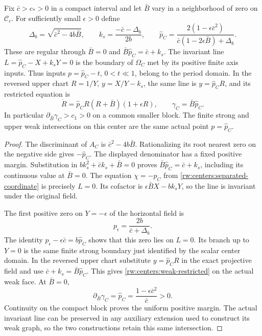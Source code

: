 \begin{lemma}\label{rw:centers:weak-boundary}
Fix $\bar c>c_*>0$ in a compact interval and let $\bar B$ vary
in a neighborhood of zero on $\mathcal C_c$. For sufficiently
small $\epsilon>0$ define
\begin{equation}\label{rw:centers:weak-intersection}
 \Delta_b=\sqrt{\bar c^2-4b\bar B},\qquad
 k_s=\frac{-\bar c-\Delta_b}{2b},\qquad
 \widehat p_C=\frac{2(1-\epsilon\bar c^2)}
                 {\bar c(1-2\epsilon\bar B)+\Delta_b}.
\end{equation}
These are regular through $\bar B=0$ and
$\bar B\widehat p_C=\bar c+k_s$.
The invariant line
$L=\widehat p_C-X+k_sY=0$ is the boundary of $\Omega_C$
met by its positive finite axis inputs. Thus inputs
$p=\widehat p_C-t$, $0<t\ll1$, belong to the period domain.
In the reversed upper chart $R=1/Y$, $y=X/Y-k_s$, the same line
is $y=\widehat p_CR$, and its restricted equation is
\begin{equation}\label{rw:centers:weak-restricted}
 \dot R=\widehat p_CR(R+\bar B)(1+\epsilon R),\qquad
 \gamma_C=\bar B\widehat p_C.
\end{equation}
In particular $\partial_{\bar B}\gamma_C>c_1>0$ on a common
smaller block. The finite strong and upper weak intersections on
this center are the same actual point $p=\widehat p_C$.
\end{lemma}

\begin{proof}
The discriminant of $A_C$ is
$\bar c^2-4b\bar B$. Rationalizing its root nearest zero on the
negative side gives $-\widehat p_C$. The displayed denominator
has a fixed positive margin. Substitution in
$bk_s^2+\bar c k_s+\bar B=0$ proves
$\bar B\widehat p_C=\bar c+k_s$, including its continuous
value at $\bar B=0$. The equation $\chi=-\widehat p_C$
from \eqref{rw:centers:separated-coordinate} is precisely $L=0$.
Its cofactor is $\epsilon\bar BX-bk_sY$, so the line is
invariant under the original field.

The first positive zero on $Y=-\epsilon$ of the horizontal field
is
\[
 p_\epsilon=\frac{2b}{\bar c+\Delta_b}.
\]
The identity $p_\epsilon-\epsilon\bar c=b\widehat p_C$
shows that this zero lies on $L=0$. Its branch up to $Y=0$
is the same finite strong boundary just identified by the scalar
center domain. In the reversed upper chart substitute
$y=\widehat p_CR$ in the exact projective field and use
$\bar c+k_s=\bar B\widehat p_C$. This gives
\eqref{rw:centers:weak-restricted} on the actual weak face. At $\bar B=0$,
\[
 \partial_{\bar B}\gamma_C=\widehat p_C
                =\frac{1-\epsilon\bar c^2}{\bar c}>0.
\]
Continuity on the compact block proves the uniform positive margin.
The actual invariant line can be preserved in any auxiliary extension
used to construct its weak graph, so the two constructions retain this
same intersection.
\end{proof}

